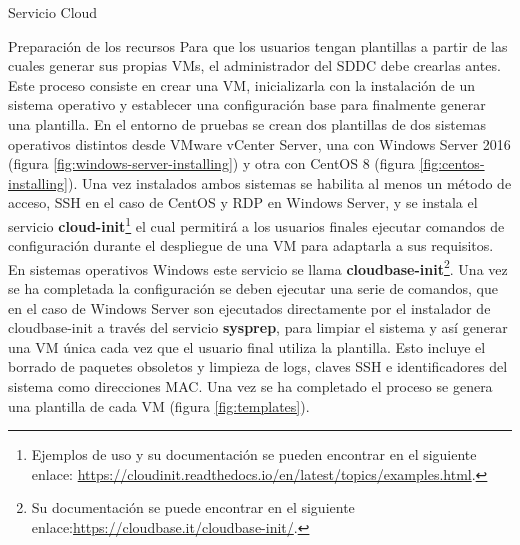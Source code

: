 \begin{subsection}{Servicio Cloud}
\begin{subsubsection}{Preparación de los recursos}
    Para que los usuarios tengan plantillas a partir de las cuales generar sus propias VMs, el administrador del SDDC debe crearlas antes. Este proceso consiste en crear una VM, inicializarla con la instalación de un sistema operativo y establecer una configuración base para finalmente generar una plantilla. En el entorno de pruebas se crean dos plantillas de dos sistemas operativos distintos desde VMware vCenter Server, una con Windows Server 2016 (figura \ref{fig:windows-server-installing}) y otra con CentOS 8 (figura \ref{fig:centos-installing}). Una vez instalados ambos sistemas se habilita al menos un método de acceso, SSH en el caso de CentOS y RDP en Windows Server, y se instala el servicio \textbf{cloud-init}\footnote{Ejemplos de uso y su documentación se pueden encontrar en el siguiente enlace: \url{https://cloudinit.readthedocs.io/en/latest/topics/examples.html}.} el cual permitirá a los usuarios finales ejecutar comandos de configuración durante el despliegue de una VM para adaptarla a sus requisitos. En sistemas operativos Windows este servicio se llama \textbf{cloudbase-init}\footnote{Su documentación se puede encontrar en el siguiente enlace:\url{https://cloudbase.it/cloudbase-init/}.}. Una vez se ha completada la configuración se deben ejecutar una serie de comandos, que en el caso de Windows Server son ejecutados directamente por el instalador de cloudbase-init a través del servicio \textbf{sysprep}, para limpiar el sistema y así generar una VM única cada vez que el usuario final utiliza la plantilla. Esto incluye el borrado de paquetes obsoletos y limpieza de logs, claves SSH e identificadores del sistema como direcciones MAC. Una vez se ha completado el proceso se genera una plantilla de cada VM (figura \ref{fig:templates}).

\end{subsubsection}
\end{subsection}
